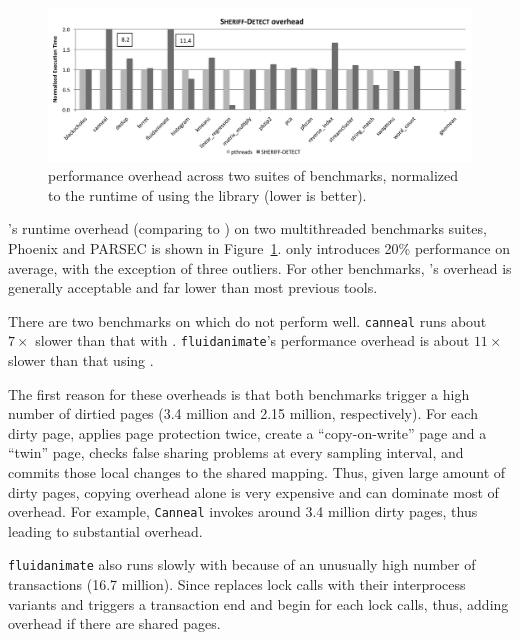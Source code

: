 \begin{figure}[!t]
\centering
\includegraphics[width=6in]{sheriff/figure/detectiveperf.pdf}
\caption{\sheriffdetect{} performance overhead across two suites of benchmarks, normalized to the runtime of using the \pthreads{} library (lower is better). \label{fig:overhead}}
\end{figure}


\SheriffDetect{}'s  runtime overhead (comparing to \pthreads{}) on two multithreaded benchmarks suites, Phoenix and PARSEC is shown in Figure~\ref{fig:overhead}.  \SheriffDetect{} only introduces 20\% performance on average, with the exception of three outliers. For other benchmarks, \SheriffDetect{}’s overhead is generally acceptable and far lower than most previous tools.


There are two benchmarks on which \sheriffdetect{} do not perform well. \texttt{canneal} runs about $7\times$ slower than that with \pthreads{}.  \texttt{fluidanimate}'s  performance overhead is about $11\times$ slower than that using \pthreads{}.

The first reason for these overheads is that both benchmarks
trigger a high number of dirtied pages (3.4 million and
2.15 million, respectively). For each dirty page, \sheriffdetect{} applies page protection twice, create a ``copy-on-write'' page and a ``twin'' page, checks false sharing problems at every sampling interval, and commits those local changes to the shared mapping. Thus, given large amount of dirty pages, copying overhead alone is very expensive and can dominate most of overhead. For example, \texttt{Canneal} invokes around 3.4 million dirty pages, thus leading to substantial overhead. 

\texttt{fluidanimate} also runs slowly with \SheriffDetect{}
because of an unusually high number of transactions (16.7
million). Since \SheriffDetect{} replaces lock calls with their interprocess variants and triggers a transaction end and begin for each lock calls, thus, adding overhead if there are shared pages.
 
